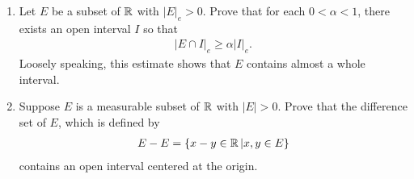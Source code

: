 \documentclass[UTF8,a4paper,10pt]{article}
\begin{document}
  \begin{Problem}[]{
    }
    \begin{enumerate}[label=(\alph*)]
      \item Let \(E\) be a subset of \(\operatorname{\mathbb{R}}\) with \(|E|_e > 0\). Prove that for each \(0 < \alpha < 1\), there
      exists an open interval \(I\) so that
      \begin{equation*}
        \begin{aligned}
          |E \cap I|_e \geq \alpha |I|_e.
        \end{aligned}
      \end{equation*}
      Loosely speaking, this estimate shows that \(E\) contains almost a whole interval.
      \item Suppose \(E\) is a measurable subset of \(\operatorname{\mathbb{R}}\) with \(|E| > 0\). Prove that the difference set of \(E\), which is defined by      
      \begin{equation*}
        \begin{aligned}
          E - E = \{x-y\in\operatorname{\mathbb{R}}|x,y\in E\}
        \end{aligned}
      \end{equation*}
      contains an open interval centered at the origin.
    \end{enumerate}

  \end{Problem}
\end{document}
